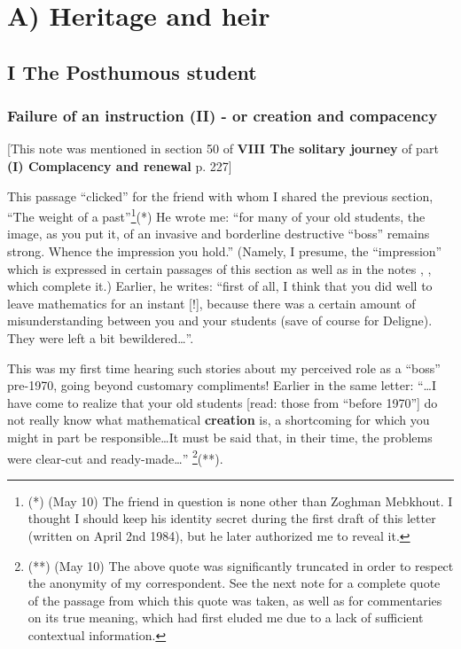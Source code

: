 \vspace*{\fill}

\newpage


\setcounter{chapter}{12}
\chapter{A) Heritage and heir}

\section{I The Posthumous student}

\subsection{Failure of an instruction (II) - or creation and compacency}

[This note was mentioned in section 50 of
\textbf{VIII The solitary journey} of part \textbf{(I)
Complacency and renewal} p. 227]

This passage ``clicked'' for the friend with whom I shared the previous section, ``The weight of a
past''\footnote{(*) (May 10) The friend in question is none other than Zoghman Mebkhout. I thought I should keep his identity secret during the first
draft of this letter (written on April 2nd 1984), but he later
authorized me to reveal it.}(*) He wrote me: ``for many of your old students,
the image, as you put it, of an invasive and borderline destructive ``boss'' remains
strong. Whence the impression you hold.'' (Namely, I presume, the 
``impression'' which is expressed in certain passages of this section as well as in the
notes
\no {}, ,  which complete it.)
Earlier, he writes: ``first of all, I think that you did well to leave mathematics for an
instant [!], because there was a certain amount of misunderstanding between you and your students (save of course for Deligne). They were left a bit bewildered\ldots''. 

This was my first time hearing such stories about my perceived role as a ``boss''
pre-1970, going beyond customary compliments!
Earlier in the same letter: ``\ldots I have come to realize that your old students 
[read: those from ``before 1970''] do not really know what mathematical
\textbf{creation} is, a shortcoming for which you might in part be responsible\ldots It must be said that, in their
time, the problems were clear-cut and ready-made\ldots'' \footnote{(**) (May 10) The above quote
was significantly truncated in order to respect the anonymity of my correspondent. See the
next note for a complete quote of the passage from which this quote was taken, as well as for
commentaries on its true meaning, which had first eluded me due to a lack of sufficient
contextual information.}(**).

